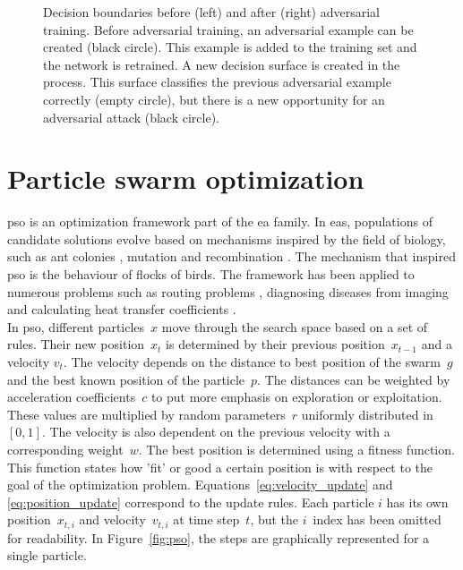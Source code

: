 \begin{figure}
\begin{tikzpicture}[x=0.75pt,y=0.75pt,yscale=-1,xscale=1]
\end{tikzpicture}
\caption[Adversarial training]{Decision boundaries before (left) and after (right) adversarial training. Before adversarial training, an adversarial example can be created (black circle). This example is added to the training set and the network is retrained. A new decision surface is created in the process. This surface classifies the previous adversarial example correctly (empty circle), but there is a new opportunity for an adversarial attack (black circle).}
\label{fig:adversarial_training}
\end{figure}


\section{Particle swarm optimization}
\gls{pso} \cite{pso} is an optimization framework part of the \gls{ea} family. In \glspl{ea}, populations of candidate solutions evolve based on mechanisms inspired by the field of biology, such as ant colonies \cite{aco}, mutation and recombination \cite{genetic_algorithm}. The mechanism that inspired \gls{pso} is the behaviour of flocks of birds. The framework has been applied to numerous problems such as routing problems \cite{ev_transport, freight_transport}, diagnosing diseases from imaging \cite{leukemia_pso} and calculating heat transfer coefficients \cite{heat_transfer_pso}.\\

In \gls{pso}, different particles~$x$ move through the search space based on a set of rules. Their new position~$x_t$ is determined by their previous position~$x_{t-1}$ and a velocity $v_t$. The velocity depends on the distance to best position of the swarm~$g$ and the best known position of the particle~$p$. The distances can be weighted by acceleration coefficients~$c$ to put more emphasis on exploration or exploitation. These values are multiplied by random parameters~$r$ uniformly distributed in~$[0,1]$. The velocity is also dependent on the previous velocity with a corresponding weight~$w$. The best position is determined using a fitness function. This function states how 'fit' or good a certain position is with respect to the goal of the optimization problem. Equations~\ref{eq:velocity_update} and \ref{eq:position_update} correspond to the update rules. Each particle $i$ has its own position~$x_{t,i}$ and velocity~$v_{t,i}$ at time step~$t$, but the $i$~index has been omitted for readability. In Figure~\ref{fig:pso}, the steps are graphically represented for a single particle.


